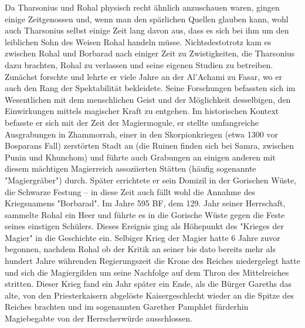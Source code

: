 \documentclass[11pt]{article}
\begin{document}
Da Tharsonius und Rohal physisch recht ähnlich anzuschauen waren, gingen einige Zeitgenossen und,
wenn man den spärlichen Quellen glauben kann, wohl auch Tharsonius selbst einige Zeit lang davon aus,
dass es sich bei ihm um den leiblichen Sohn des Weisen Rohal handeln müsse. Nichtsdestotrotz kam es
zwischen Rohal und Borbarad nach einiger Zeit zu Zwistigkeiten, die Tharsonius dazu brachten, Rohal zu
verlassen und seine eigenen Studien zu betreiben. Zunächst forschte und lehrte er viele Jahre an der
Al'Achami zu Fasar, wo er auch den Rang der Spektabilität bekleidete. Seine Forschungen befassten sich
im Wesentlichen mit dem menschlichen Geist und der Möglichkeit desselbigen, den Einwirkungen mittels
magischer Kraft zu entgehen. Im historischen Kontext befasste er sich mit der Zeit der Magiermogule, er
stellte umfangreiche Ausgrabungen in Zhammorrah, einer in den Skorpionkriegen (etwa 1300 vor
Bosparans Fall) zerstörten Stadt an (die Ruinen finden sich bei Samra, zwischen Punin und Khunchom)
und führte auch Grabungen an einigen anderen mit diesem mächtigen Magierreich assoziierten Stätten
(häufig sogenannte "Magiergräber") durch. Später errichtete er sein Domizil in der Gorischen Wüste, die
Schwarze Festung – in diese Zeit auch fällt wohl die Annahme des Kriegsnamens "Borbarad". Im Jahre
595 BF, dem 129. Jahr seiner Herrschaft, sammelte Rohal ein Heer und führte es in die Gorische Wüste
gegen die Feste seines einstigen Schülers. Dieses Ereignis ging als Höhepunkt des "Krieges der Magier"
in die Geschichte ein. Selbiger Krieg der Magier hatte 6 Jahre zuvor begonnen, nachdem Rohal ob der
Kritik an seiner bis dato bereits mehr als hundert Jahre währenden Regierungszeit die Krone des Reiches
niedergelegt hatte und sich die Magiergilden um seine Nachfolge auf dem Thron des Mittelreiches stritten. Dieser Krieg fand ein Jahr später ein Ende, als die Bürger Gareths das alte, von den Priesterkaisern
abgelöste Kaisergeschlecht wieder an die Spitze des Reiches brachten und im sogenannten Garether
Pamphlet fürderhin Magiebegabte von der Herrscherwürde ausschlossen.
\end{document}
